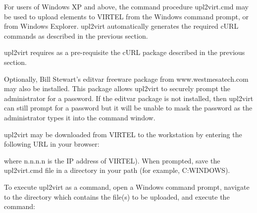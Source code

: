 \documentclass[letterpaper,10pt,english]{sphinxmanual}
\begin{document}

For users of Windows XP and above, the command procedure upl2virt.cmd may be used to upload elements to VIRTEL from the Windows command prompt, or from Windows Explorer. upl2virt automatically generates the required cURL commands as described in the previous section.


upl2virt requires as a pre-requisite the cURL package described in the previous section.

Optionally, Bill Stewart’s editvar freeware package from www.westmesatech.com may also be installed. This package allows upl2virt to securely prompt the administrator for a password. If the editvar package is not installed, then upl2virt can still prompt for a password but it will be unable to mask the password as the administrator types it into
the command window.


upl2virt may be downloaded from VIRTEL to the workstation by entering the following URL in your browser:

\begin{sphinxVerbatim}[commandchars=\\\{\}]
\end{sphinxVerbatim}

where n.n.n.n is the IP address of VIRTEL). When prompted, save the upl2virt.cmd file in a directory in your path (for example, C:WINDOWS).


To execute upl2virt as a command, open a Windows command prompt, navigate to the directory which contains the file(s) to be uploaded, and execute the command:

\begin{sphinxVerbatim}[commandchars=\\\{\}]
 \PYG{p}{[} \PYG{p}{]}    
         \PYG{p}{[} \PYG{p}{]} \PYG{p}{[}\PYG{p}{]} \PYG{p}{[} \PYG{p}{]} \PYG{p}{[}\PYG{p}{]} \PYG{p}{[}  \PYG{p}{]}
\end{sphinxVerbatim}
\end{document}
